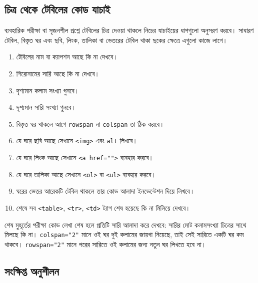 \subsection{চিত্র থেকে টেবিলের কোড যাচাই}

ব্যবহারিক পরীক্ষা বা সৃজনশীল প্রশ্নে টেবিলের চিত্র দেওয়া থাকলে নিচের যাচাইয়ের ধাপগুলো অনুসরণ করবে। সাধারণ টেবিল, বিস্তৃত ঘর এবং ছবি, লিংক, তালিকা বা ভেতরের টেবিল থাকা ছকের ক্ষেত্রে এগুলো কাজে লাগে।

\begin{enumerate}
\item টেবিলের নাম বা ক্যাপশন আছে কি না দেখবে।
\item শিরোনামের সারি আছে কি না দেখবে।
\item দৃশ্যমান কলাম সংখ্যা গুনবে।
\item দৃশ্যমান সারি সংখ্যা গুনবে।
\item বিস্তৃত ঘর থাকলে আগে \texttt{rowspan} না \texttt{colspan} তা ঠিক করবে।
\item যে ঘরে ছবি আছে সেখানে \texttt{<img>} এবং \texttt{alt} লিখবে।
\item যে ঘরে লিংক আছে সেখানে \texttt{<a href="">} ব্যবহার করবে।
\item যে ঘরে তালিকা আছে সেখানে \texttt{<ol>} বা \texttt{<ul>} ব্যবহার করবে।
\item ঘরের ভেতর আরেকটি টেবিল থাকলে তার কোড আলাদা ইনডেন্টেশন দিয়ে লিখবে।
\item শেষে সব \texttt{<table>}, \texttt{<tr>}, \texttt{<td>} ট্যাগ শেষ হয়েছে কি না মিলিয়ে দেখবে।
\end{enumerate}

\begin{keypointbox}{শেষ মুহূর্তের পরীক্ষা}
কোড লেখা শেষ হলে প্রতিটি সারি আলাদা করে দেখবে: সারির মোট কলামসংখ্যা চিত্রের সাথে মিলছে কি না। \texttt{colspan="2"} মানে ওই ঘর দুই কলামের জায়গা নিয়েছে, তাই সেই সারিতে একটি ঘর কম থাকবে। \texttt{rowspan="2"} মানে পরের সারিতে ওই কলামের জন্য নতুন ঘর লিখতে হবে না।
\end{keypointbox}


\subsection{সংক্ষিপ্ত অনুশীলন}

